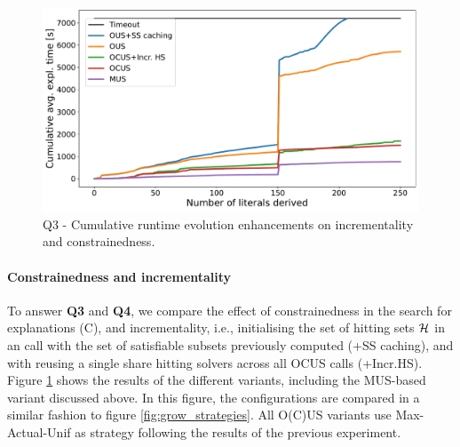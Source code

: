 \begin{figure}[t]
  \centering
  \includegraphics[width=\columnwidth]{figures_post_paper/cumul_incr_avg_time_lits_derived.pdf}
  \caption{Q3 - Cumulative runtime evolution enhancements on incrementality and constrainedness.}
  \label{fig:incrementality_constraindness}
\end{figure}

\paragraph{Constrainedness and incrementality}
To answer \textbf{Q3} and \textbf{Q4}, we compare the effect of constrainedness in the search for explanations (C), and incrementality, i.e., initialising the set of hitting sets ${\cal H}$ in an \omus call with the set of satisfiable subsets previously computed (+SS caching), and with reusing a single share hitting solvers across all OCUS calls (+Incr.HS).
% 
Figure \ref{fig:incrementality_constraindness} shows the results of the different variants, including the MUS-based variant discussed above. 
In this figure, the configurations are compared in a similar fashion to figure \ref{fig:grow_strategies}.
All O(C)US variants use Max-Actual-Unif as \grow strategy following the results of the previous experiment.%

